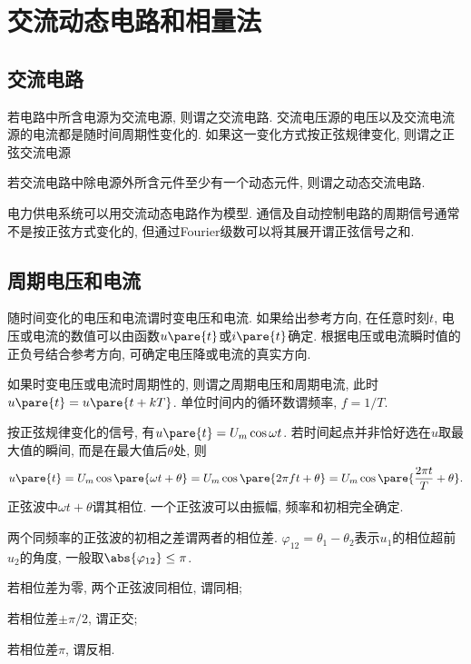 \documentclass{ctexart}
\begin{document}
\section{交流动态电路和相量法} %
\label{sec:交流动态电路和相量法}

\subsection{交流电路} %
\label{sub:交流电路}

若电路中所含电源为交流电源, 则谓之交流电路. 交流电压源的电压以及交流电流源的电流都是随时间周期性变化的. 如果这一变化方式按正弦规律变化, 则谓之正弦交流电源
\par
若交流电路中除电源外所含元件至少有一个动态元件, 则谓之动态交流电路.
\par
电力供电系统可以用交流动态电路作为模型. 通信及自动控制电路的周期信号通常不是按正弦方式变化的, 但通过Fourier级数可以将其展开谓正弦信号之和.


\subsection{周期电压和电流} %
\label{sub:周期电压和电流}

随时间变化的电压和电流谓时变电压和电流. 如果给出参考方向, 在任意时刻$t$, 电压或电流的数值可以由函数$u\pare{t}$或$i\pare{t}$确定. 根据电压或电流瞬时值的正负号结合参考方向, 可确定电压降或电流的真实方向.
\par
如果时变电压或电流时周期性的, 则谓之周期电压和周期电流, 此时$u\pare{t} = u\pare{t+kT}$. 单位时间内的循环数谓频率, $f = 1/T$.
\par
按正弦规律变化的信号, 有$u\pare{t} = U_m \cos \omega t$. 若时间起点并非恰好选在$u$取最大值的瞬间, 而是在最大值后$\theta$处, 则
\[ u\pare{t} = U_m \cos\pare{\omega t + \theta} = U_m\cos\pare{2\pi ft + \theta} = U_m\cos\pare{\frac{2\pi t}{T}+\theta}. \]
正弦波中$\omega t + \theta$谓其相位. 一个正弦波可以由振幅, 频率和初相完全确定.
\par
两个同频率的正弦波的初相之差谓两者的相位差. $\varphi_{12} = \theta_1 - \theta_2$表示$u_1$的相位超前$u_2$的角度, 一般取$\abs{\varphi_{12}}\le \pi$.
\begin{cenum}
    \item 若相位差为零, 两个正弦波同相位, 谓同相;
    \item 若相位差$\pm \pi/2$, 谓正交;
    \item 若相位差$\pi$, 谓反相.
\end{cenum}
\end{document}
